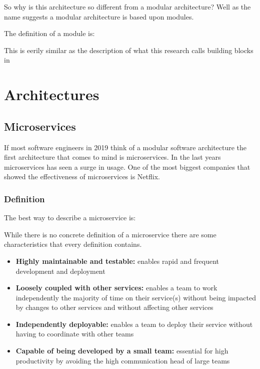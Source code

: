 So why is this architecture so different from a modular architecture? Well as the name suggests a modular architecture is based upon modules.

The definition of a module is:

This is eerily similar as the description of what this research calls building blocks in 

\section{Architectures}
\label{sec:Architectures}

\subsection{Microservices}
If most software engineers in 2019 think of a modular software architecture the first architecture that comes to mind is microservices. In the last years microservices has seen a surge in usage. One of the most biggest companies that showed the effectiveness of microservices is Netflix.

\subsubsection{Definition}
The best way to describe a microservice is:

While there is no concrete definition of a microservice there are some characteristics that
every definition contains.
\begin{itemize}
        \item \textbf{Highly maintainable and testable:} enables rapid and frequent development and deployment

        \item \textbf{Loosely coupled with other services:} enables a team to work independently the majority of time on their service(s) without being impacted by changes to other services and without affecting other services

        \item \textbf{Independently deployable:} enables a team to deploy their service without having to coordinate with other teams

        \item \textbf{Capable of being developed by a small team:} essential for high productivity by avoiding the high communication head of large teams \cite{microservicesCharactaristics}
\end{itemize}

